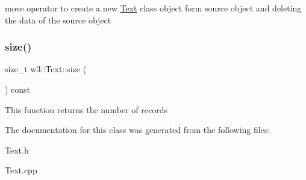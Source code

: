 move operator to create a new \mbox{\hyperlink{classw3_1_1Text}{Text}} class object form source object and deleting the data of the source object \mbox{\label{classw3_1_1Text_aa738305950f5a5def3c56b98dcc5e14a}} 
\subsubsection{\texorpdfstring{size()}{size()}}
{\footnotesize\ttfamily size\+\_\+t w3\+::\+Text\+::size (\begin{DoxyParamCaption}{ }\end{DoxyParamCaption}) const}

This function returns the number of records 

The documentation for this class was generated from the following files\+:\begin{DoxyCompactItemize}
\item 
Text.\+h\item 
Text.\+cpp\end{DoxyCompactItemize}
